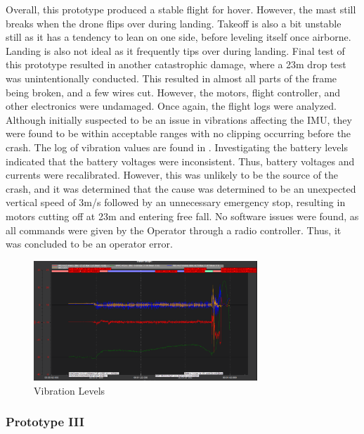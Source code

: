 \documentclass{article}
\begin{document}
Overall, this prototype produced a stable flight for hover. However, the mast still breaks when the drone flips over during landing. Takeoff is also a bit unstable still as it has a tendency to lean on one side, before leveling itself once airborne. Landing is also not ideal as it frequently tips over during landing. Final test of this prototype resulted in another catastrophic damage, where a 23m drop test was unintentionally conducted. This resulted in almost all parts of the frame being broken, and a few wires cut. However, the motors, flight controller, and other electronics were undamaged. Once again, the flight logs were analyzed. Although initially suspected to be an issue in vibrations affecting the IMU, they were found to be within acceptable ranges with no clipping occurring before the crash. The log of vibration values are found in . Investigating the battery levels indicated that the battery voltages were inconsistent. Thus, battery voltages and currents were recalibrated. However, this was unlikely to be the source of the crash, and it was determined that the cause was determined to be an unexpected vertical speed of 3m/s followed by an unnecessary emergency stop, resulting in motors cutting off at 23m and entering free fall. No software issues were found, as all commands were given by the Operator through a radio controller. Thus, it was concluded to be an operator error.

\begin{figure}[h!]
  \begin{center} 
  \caption{Vibration Levels}
  \label{fig:vibLevels}
        \includegraphics[width=0.75\textwidth]{Reflection/VibrationLogs.png}
  \end{center}
\end{figure}

\clearpage

\subsubsection{Prototype III}
\end{document}
